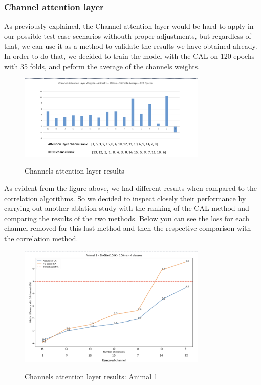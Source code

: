 \documentclass{Configuration_Files/PoliMi3i_thesis}
\begin{document}
\subsubsection*{Channel attention layer}

As previously explained, the Channel attention layer would be hard to apply in our possible test case scenarios withouth proper adjustments, but regardless of that, we can use it as a method to validate the results we have obtained already.
In order to do that, we decided to train the model with the CAL on 120 epochs with 35 folds, and peform the average of the channels weights.

\begin{figure}[H]
    \centering
    \includegraphics[width=0.8\textwidth]{Results Matteo/figure10}
    \label{fiure_10}
    \caption{Channels attention layer results}
\end{figure}

As evident from the figure above, we had different results when compared to the correlation algorithms.
So we decided to inspect closely their performance by carrying out another ablation study with the ranking of the CAL method and comparing the results of the two methods.
Below you can see the loss for each channel removed for this last method and then the respective comparison with the correlation method.

\begin{figure}[H]
    \centering
    \includegraphics[width=0.8\textwidth]{Results Matteo/figure11}
    \label{fiure_11}
    \caption{Channels attention layer results: Animal 1}
\end{figure}
\end{document}
